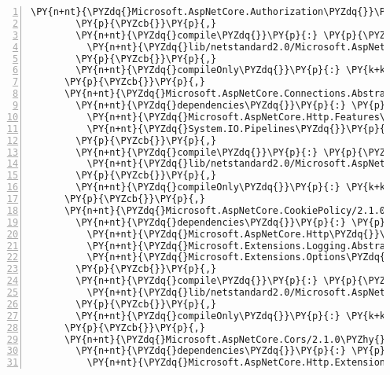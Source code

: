 \begin{Verbatim}[commandchars=\\\{\},numbers=left,firstnumber=1,stepnumber=1,numberblanklines=0]
          \PY{n+nt}{\PYZdq{}Microsoft.AspNetCore.Authorization\PYZdq{}}\PY{p}{:} \PY{l+s+s2}{\PYZdq{}2.1.0\PYZhy{}rc1\PYZhy{}final\PYZdq{}}
        \PY{p}{\PYZcb{}}\PY{p}{,}
        \PY{n+nt}{\PYZdq{}compile\PYZdq{}}\PY{p}{:} \PY{p}{\PYZob{}}
          \PY{n+nt}{\PYZdq{}lib/netstandard2.0/Microsoft.AspNetCore.Authorization.Policy.dll\PYZdq{}}\PY{p}{:} \PY{p}{\PYZob{}}\PY{p}{\PYZcb{}}
        \PY{p}{\PYZcb{}}\PY{p}{,}
        \PY{n+nt}{\PYZdq{}compileOnly\PYZdq{}}\PY{p}{:} \PY{k+kc}{true}
      \PY{p}{\PYZcb{}}\PY{p}{,}
      \PY{n+nt}{\PYZdq{}Microsoft.AspNetCore.Connections.Abstractions/2.1.0\PYZhy{}rc1\PYZhy{}final\PYZdq{}}\PY{p}{:} \PY{p}{\PYZob{}}
        \PY{n+nt}{\PYZdq{}dependencies\PYZdq{}}\PY{p}{:} \PY{p}{\PYZob{}}
          \PY{n+nt}{\PYZdq{}Microsoft.AspNetCore.Http.Features\PYZdq{}}\PY{p}{:} \PY{l+s+s2}{\PYZdq{}2.1.0\PYZhy{}rc1\PYZhy{}final\PYZdq{}}\PY{p}{,}
          \PY{n+nt}{\PYZdq{}System.IO.Pipelines\PYZdq{}}\PY{p}{:} \PY{l+s+s2}{\PYZdq{}4.5.0\PYZhy{}rc1\PYZdq{}}
        \PY{p}{\PYZcb{}}\PY{p}{,}
        \PY{n+nt}{\PYZdq{}compile\PYZdq{}}\PY{p}{:} \PY{p}{\PYZob{}}
          \PY{n+nt}{\PYZdq{}lib/netstandard2.0/Microsoft.AspNetCore.Connections.Abstractions.dll\PYZdq{}}\PY{p}{:} \PY{p}{\PYZob{}}\PY{p}{\PYZcb{}}
        \PY{p}{\PYZcb{}}\PY{p}{,}
        \PY{n+nt}{\PYZdq{}compileOnly\PYZdq{}}\PY{p}{:} \PY{k+kc}{true}
      \PY{p}{\PYZcb{}}\PY{p}{,}
      \PY{n+nt}{\PYZdq{}Microsoft.AspNetCore.CookiePolicy/2.1.0\PYZhy{}rc1\PYZhy{}final\PYZdq{}}\PY{p}{:} \PY{p}{\PYZob{}}
        \PY{n+nt}{\PYZdq{}dependencies\PYZdq{}}\PY{p}{:} \PY{p}{\PYZob{}}
          \PY{n+nt}{\PYZdq{}Microsoft.AspNetCore.Http\PYZdq{}}\PY{p}{:} \PY{l+s+s2}{\PYZdq{}2.1.0\PYZhy{}rc1\PYZhy{}final\PYZdq{}}\PY{p}{,}
          \PY{n+nt}{\PYZdq{}Microsoft.Extensions.Logging.Abstractions\PYZdq{}}\PY{p}{:} \PY{l+s+s2}{\PYZdq{}2.1.0\PYZhy{}rc1\PYZhy{}final\PYZdq{}}\PY{p}{,}
          \PY{n+nt}{\PYZdq{}Microsoft.Extensions.Options\PYZdq{}}\PY{p}{:} \PY{l+s+s2}{\PYZdq{}2.1.0\PYZhy{}rc1\PYZhy{}final\PYZdq{}}
        \PY{p}{\PYZcb{}}\PY{p}{,}
        \PY{n+nt}{\PYZdq{}compile\PYZdq{}}\PY{p}{:} \PY{p}{\PYZob{}}
          \PY{n+nt}{\PYZdq{}lib/netstandard2.0/Microsoft.AspNetCore.CookiePolicy.dll\PYZdq{}}\PY{p}{:} \PY{p}{\PYZob{}}\PY{p}{\PYZcb{}}
        \PY{p}{\PYZcb{}}\PY{p}{,}
        \PY{n+nt}{\PYZdq{}compileOnly\PYZdq{}}\PY{p}{:} \PY{k+kc}{true}
      \PY{p}{\PYZcb{}}\PY{p}{,}
      \PY{n+nt}{\PYZdq{}Microsoft.AspNetCore.Cors/2.1.0\PYZhy{}rc1\PYZhy{}final\PYZdq{}}\PY{p}{:} \PY{p}{\PYZob{}}
        \PY{n+nt}{\PYZdq{}dependencies\PYZdq{}}\PY{p}{:} \PY{p}{\PYZob{}}
          \PY{n+nt}{\PYZdq{}Microsoft.AspNetCore.Http.Extensions\PYZdq{}}\PY{p}{:} \PY{l+s+s2}{\PYZdq{}2.1.0\PYZhy{}rc1\PYZhy{}final\PYZdq{}}\PY{p}{,}

\end{Verbatim}
